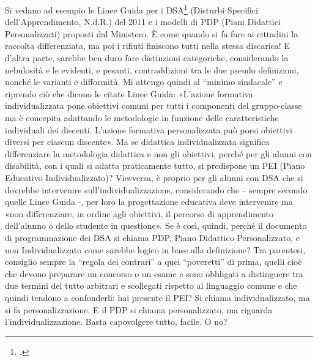 Si vedano ad esempio le Linee Guida per i DSA\footcite{LineGuida2011} (Disturbi Specifici dell'Apprendimento, N.d.R.) del 2011 e i modelli di PDP (Piani Didattici Personalizzati) proposti dal Ministero. È come quando si fa fare ai cittadini la raccolta differenziata, ma poi i rifiuti finiscono tutti nella stessa discarica! E d'altra parte, sarebbe ben duro fare distinzioni categoriche, considerando la nebulosità e le evidenti, e pesanti, contraddizioni tra le due pseudo definizioni, nonché le varianti e difformità.
Mi attengo quindi al “minimo sindacale” e riprendo ciò che dicono le citate Linee Guida: «L'azione formativa individualizzata pone obiettivi comuni per tutti i componenti del gruppo-classe ma è concepita adattando le metodologie in funzione delle caratteristiche individuali dei discenti\mancatesto. L'azione formativa personalizzata \mancatesto può  porsi  obiettivi  diversi per  ciascun discente».
Ma se didattica individualizzata significa differenziare la metodologia didattica e non gli obiettivi, perché per gli alunni con disabilità, con i quali si adatta praticamente tutto, si predispone un PEI (Piano Educativo Individualizzato)? Viceversa, è proprio per gli alunni con DSA che si dovrebbe intervenire sull'individualizzazione, considerando che – sempre secondo quelle Linee Guida -, per loro la progettazione educativa deve intervenire ma «non differenziare, in ordine agli obiettivi, il percorso di apprendimento dell'alunno o dello studente in questione». Se è così, quindi, perché il documento di programmazione dei DSA si chiama PDP, Piano Didattico Personalizzato, e non Individualizzato come sarebbe logico in base alla definizione?
Tra parentesi, consiglio sempre la “regola dei contrari” a quei “poveretti” di prima, quelli cioè che devono preparare un concorso o un esame e sono obbligati a distinguere tra due termini del tutto arbitrari e scollegati rispetto al linguaggio comune e che quindi tendono a confonderli: hai presente il PEI? Si chiama individualizzato, ma si fa personalizzazione. E il PDP si chiama personalizzato, ma riguarda l'individualizzazione. Basta capovolgere tutto, facile. O no?


